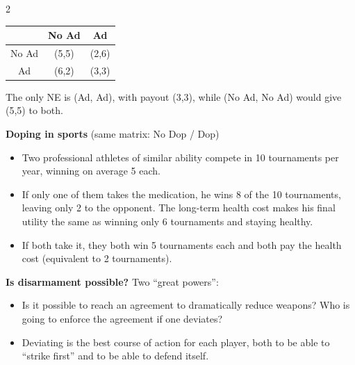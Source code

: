 \documentclass[a4paper,9pt]{extarticle}
\begin{document}
\begin{multicols}{2}
\begin{example}
\begin{itemize}
\end{itemize}

\begin{center}
\begin{tabular}{c|cc}
 & No Ad & Ad \\
\hline
No Ad & (5,5) & (2,6) \\
Ad & (6,2) & (3,3) \\
\end{tabular}
\end{center}

The only NE is (Ad, Ad), with payout (3,3), while (No Ad, No Ad) would give (5,5) to both.

\end{example}


\begin{example}

\textbf{Doping in sports} (same matrix: No Dop / Dop)

\begin{itemize}

\item Two professional athletes of similar ability compete in 10 tournaments per year,
winning on average 5 each.

\item If only one of them takes the medication, he wins 8 of the 10 tournaments, leaving
only 2 to the opponent. The long-term health cost makes his final utility the same as
winning only 6 tournaments and staying healthy.

\item If both take it, they both win 5 tournaments each and both pay the health cost
(equivalent to 2 tournaments).

\end{itemize}

\end{example}


\begin{example}

\textbf{Is disarmament possible?} Two ``great powers'':

\begin{itemize}

\item Is it possible to reach an agreement to dramatically reduce weapons? Who is going to
enforce the agreement if one deviates?

\item Deviating is the best course of action for each player, both to be able to
``strike first'' and to be able to defend itself.


\end{itemize}
\end{example}
\end{multicols}
\end{document}
